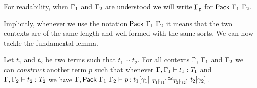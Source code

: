 For readability, when $\Ga_1$ and $\Ga_2$ are understood we will write $\Gp$ for
$\Pack{\Ga_1}{\Ga_2}$.

Implicitly, whenever we use the notation $\Pack{\Ga_1}{\Ga_2}$ it means that
the two contexts are of the same length and well-formed with the same
sorts.
%
We can now tackle the fundamental lemma.

\begin{lemma}
  Let $t_1$ and $t_2$ be two terms such that \(t_1 \sim t_2\).
  For all contexts \(\Ga\), \(\Ga_1\) and \(\Ga_2\) we can \emph{construct}
  another term \(p\) such that whenever $\isterm{\Ga, \Ga_1}{t_1}{T_1}$ and
  $\isterm{\Ga, \Ga_2}{t_2}{T_2}$ we have
  $\isterm{\Ga, \Pack{\Ga_1}{\Ga_2}}
          {p}
          {\Heq{\llift{\gamma}{}{T_1}}
               {\llift{\gamma}{}{t_1}}
               {\rlift{\gamma}{}{T_2}}
               {\rlift{\gamma}{}{t_2}}}$.
\end{lemma}

